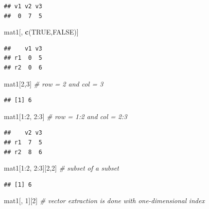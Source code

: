 \documentclass[]{book}
\newenvironment{Shaded}{\begin{snugshade}}{\end{snugshade}}
\newcommand{\KeywordTok}[1]{\textcolor[rgb]{0.13,0.29,0.53}{\textbf{{#1}}}}
\newcommand{\DecValTok}[1]{\textcolor[rgb]{0.00,0.00,0.81}{{#1}}}
\newcommand{\CommentTok}[1]{\textcolor[rgb]{0.56,0.35,0.01}{\textit{{#1}}}}
\newcommand{\OtherTok}[1]{\textcolor[rgb]{0.56,0.35,0.01}{{#1}}}
\newcommand{\NormalTok}[1]{{#1}}
\theoremstyle{definition}
\theoremstyle{definition}
\theoremstyle{remark}
\begin{document}
\begin{verbatim}
## v1 v2 v3 
##  0  7  5
\end{verbatim}

\begin{Shaded}
\begin{Highlighting}[]
\NormalTok{mat1[, }\KeywordTok{c}\NormalTok{(}\OtherTok{TRUE}\NormalTok{,}\OtherTok{FALSE}\NormalTok{)]}
\end{Highlighting}
\end{Shaded}

\begin{verbatim}
##    v1 v3
## r1  0  5
## r2  0  6
\end{verbatim}

\begin{Shaded}
\begin{Highlighting}[]
\NormalTok{mat1[}\DecValTok{2}\NormalTok{,}\DecValTok{3}\NormalTok{]  }\CommentTok{# row = 2 and col = 3}
\end{Highlighting}
\end{Shaded}

\begin{verbatim}
## [1] 6
\end{verbatim}

\begin{Shaded}
\begin{Highlighting}[]
\NormalTok{mat1[}\DecValTok{1}\NormalTok{:}\DecValTok{2}\NormalTok{, }\DecValTok{2}\NormalTok{:}\DecValTok{3}\NormalTok{]  }\CommentTok{# row = 1:2 and col = 2:3}
\end{Highlighting}
\end{Shaded}

\begin{verbatim}
##    v2 v3
## r1  7  5
## r2  8  6
\end{verbatim}

\begin{Shaded}
\begin{Highlighting}[]
\NormalTok{mat1[}\DecValTok{1}\NormalTok{:}\DecValTok{2}\NormalTok{, }\DecValTok{2}\NormalTok{:}\DecValTok{3}\NormalTok{][}\DecValTok{2}\NormalTok{,}\DecValTok{2}\NormalTok{]  }\CommentTok{# subset of a subset}
\end{Highlighting}
\end{Shaded}

\begin{verbatim}
## [1] 6
\end{verbatim}

\begin{Shaded}
\begin{Highlighting}[]
\NormalTok{mat1[, }\DecValTok{1}\NormalTok{][}\DecValTok{2}\NormalTok{]  }\CommentTok{# vector extraction is done with one-dimensional index  }
\end{Highlighting}
\end{Shaded}
\end{document}

